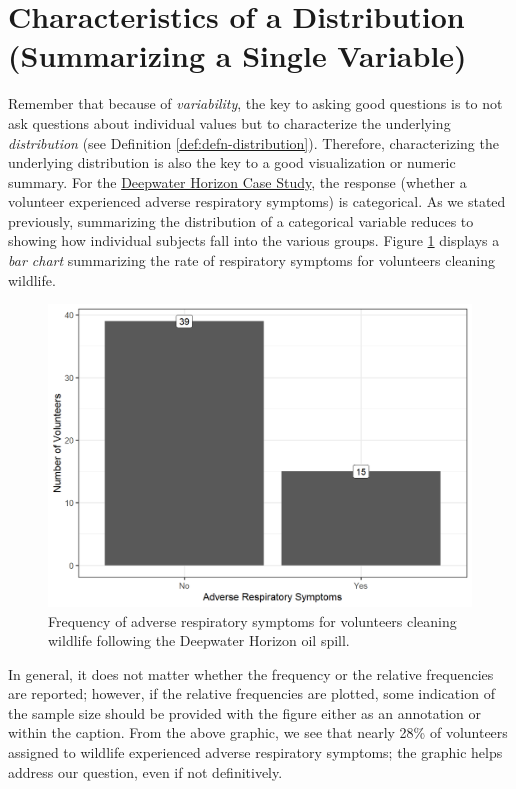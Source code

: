 \documentclass[
]{book}
\theoremstyle{plain}
\theoremstyle{mydefn}
\theoremstyle{myexmpl}
\theoremstyle{remark}
\begin{document}
\hypertarget{characteristics-of-a-distribution-summarizing-a-single-variable}{%
\section{Characteristics of a Distribution (Summarizing a Single Variable)}\label{characteristics-of-a-distribution-summarizing-a-single-variable}}

Remember that because of \emph{variability}, the key to asking good questions is to not ask questions about individual values but to characterize the underlying \emph{distribution} (see Definition \ref{def:defn-distribution}). Therefore, characterizing the underlying distribution is also the key to a good visualization or numeric summary. For the \protect\hyperlink{CaseDeepwater}{Deepwater Horizon Case Study}, the response (whether a volunteer experienced adverse respiratory symptoms) is categorical. As we stated previously, summarizing the distribution of a categorical variable reduces to showing how individual subjects fall into the various groups. Figure \ref{fig:summaries-deepwater-barchart} displays a \emph{bar chart} summarizing the rate of respiratory symptoms for volunteers cleaning wildlife.

\begin{figure}

{\centering \includegraphics[width=0.8\linewidth]{./Images/summaries-deepwater-barchart-1} 

}

\caption{Frequency of adverse respiratory symptoms for volunteers cleaning wildlife following the Deepwater Horizon oil spill.}\label{fig:summaries-deepwater-barchart}
\end{figure}

In general, it does not matter whether the frequency or the relative frequencies are reported; however, if the relative frequencies are plotted, some indication of the sample size should be provided with the figure either as an annotation or within the caption. From the above graphic, we see that nearly 28\% of volunteers assigned to wildlife experienced adverse respiratory symptoms; the graphic helps address our question, even if not definitively.
\end{document}
